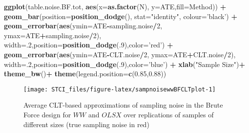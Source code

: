 \documentclass[]{book}
\newenvironment{Shaded}{\begin{snugshade}}{\end{snugshade}}
\newcommand{\DataTypeTok}[1]{\textcolor[rgb]{0.13,0.29,0.53}{#1}}
\newcommand{\DecValTok}[1]{\textcolor[rgb]{0.00,0.00,0.81}{#1}}
\newcommand{\FloatTok}[1]{\textcolor[rgb]{0.00,0.00,0.81}{#1}}
\newcommand{\KeywordTok}[1]{\textcolor[rgb]{0.13,0.29,0.53}{\textbf{#1}}}
\newcommand{\NormalTok}[1]{#1}
\newcommand{\OperatorTok}[1]{\textcolor[rgb]{0.81,0.36,0.00}{\textbf{#1}}}
\newcommand{\StringTok}[1]{\textcolor[rgb]{0.31,0.60,0.02}{#1}}
\theoremstyle{definition}
\theoremstyle{definition}
\theoremstyle{definition}
\theoremstyle{remark}
\begin{document}
\begin{Shaded}
\begin{Highlighting}[]
\KeywordTok{ggplot}\NormalTok{(table.noise.BF.tot, }\KeywordTok{aes}\NormalTok{(}\DataTypeTok{x=}\KeywordTok{as.factor}\NormalTok{(N), }\DataTypeTok{y=}\NormalTok{ATE,}\DataTypeTok{fill=}\NormalTok{Method)) }\OperatorTok{+}
\StringTok{  }\KeywordTok{geom_bar}\NormalTok{(}\DataTypeTok{position=}\KeywordTok{position_dodge}\NormalTok{(), }\DataTypeTok{stat=}\StringTok{"identity"}\NormalTok{, }\DataTypeTok{colour=}\StringTok{'black'}\NormalTok{) }\OperatorTok{+}
\StringTok{  }\KeywordTok{geom_errorbar}\NormalTok{(}\KeywordTok{aes}\NormalTok{(}\DataTypeTok{ymin=}\NormalTok{ATE}\OperatorTok{-}\NormalTok{sampling.noise}\OperatorTok{/}\DecValTok{2}\NormalTok{, }\DataTypeTok{ymax=}\NormalTok{ATE}\OperatorTok{+}\NormalTok{sampling.noise}\OperatorTok{/}\DecValTok{2}\NormalTok{), }\DataTypeTok{width=}\NormalTok{.}\DecValTok{2}\NormalTok{,}\DataTypeTok{position=}\KeywordTok{position_dodge}\NormalTok{(.}\DecValTok{9}\NormalTok{),}\DataTypeTok{color=}\StringTok{'red'}\NormalTok{) }\OperatorTok{+}
\StringTok{  }\KeywordTok{geom_errorbar}\NormalTok{(}\KeywordTok{aes}\NormalTok{(}\DataTypeTok{ymin=}\NormalTok{ATE}\OperatorTok{-}\NormalTok{CLT.noise}\OperatorTok{/}\DecValTok{2}\NormalTok{, }\DataTypeTok{ymax=}\NormalTok{ATE}\OperatorTok{+}\NormalTok{CLT.noise}\OperatorTok{/}\DecValTok{2}\NormalTok{), }\DataTypeTok{width=}\NormalTok{.}\DecValTok{2}\NormalTok{,}\DataTypeTok{position=}\KeywordTok{position_dodge}\NormalTok{(.}\DecValTok{9}\NormalTok{),}\DataTypeTok{color=}\StringTok{'blue'}\NormalTok{) }\OperatorTok{+}
\StringTok{  }\KeywordTok{xlab}\NormalTok{(}\StringTok{"Sample Size"}\NormalTok{)}\OperatorTok{+}
\StringTok{  }\KeywordTok{theme_bw}\NormalTok{()}\OperatorTok{+}
\StringTok{  }\KeywordTok{theme}\NormalTok{(}\DataTypeTok{legend.position=}\KeywordTok{c}\NormalTok{(}\FloatTok{0.85}\NormalTok{,}\FloatTok{0.88}\NormalTok{))}
\end{Highlighting}
\end{Shaded}

\begin{figure}[htbp]

{\centering \texttt{[image: STCI\_files/figure-latex/sampnoisewwBFCLTplot-1]} 

}

\caption{Average CLT-based approximations of sampling noise in the Brute Force design for $WW$ and $OLSX$ over replications of samples of different sizes (true sampling noise in red)}\label{fig:sampnoisewwBFCLTplot}
\end{figure}
\end{document}
